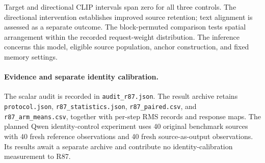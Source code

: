 Target and directional CLIP intervals span zero for all three controls. The directional intervention establishes improved source retention; text alignment is assessed as a separate outcome. The block-permuted comparison tests spatial arrangement within the recorded request-weight distribution. The inference concerns this model, eligible source population, anchor construction, and fixed memory settings.

\paragraph{Evidence and separate identity calibration.}
The scalar audit is recorded in \texttt{audit\_r87.json}. The result archive retains \texttt{protocol.json}, \texttt{r87\_statistics.json}, \texttt{r87\_paired.csv}, and \texttt{r87\_arm\_means.csv}, together with per-step RMS records and response maps. The planned Qwen identity-control experiment uses 40 original benchmark sources with 40 fresh reference observations and 40 fresh source-as-output observations. Its results await a separate archive and contribute no identity-calibration measurement to R87.
